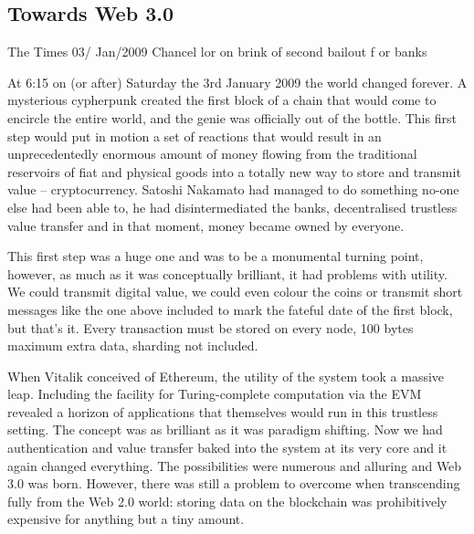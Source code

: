 \subsection{Towards Web 3.0 \statusgreen}\label{sec:towards-web3}


\begin{centerverbatim}
The Times 03/
Jan/2009 Chancel
lor on brink of 
second bailout f
or banks

\end{centerverbatim}

At 6:15 on (or after) Saturday the 3rd January 2009 the world changed forever. A mysterious cypherpunk created the first block of a chain that would come to encircle the entire world, and the genie was officially out of the bottle. This first step would put in motion a set of reactions that would result in an unprecedentedly enormous amount of money flowing from the traditional reservoirs of fiat and physical goods into a totally new way to store and transmit value -- cryptocurrency. Satoshi Nakamato had managed to do something no-one else had been able to, he had disintermediated the banks, decentralised trustless value transfer and in that moment, money became owned by everyone.

This first step was a huge one and was to be a monumental turning point, however, as much as it was conceptually brilliant, it had problems with utility. We could transmit digital value, we could even colour the coins or transmit short messages like the one above included to mark the fateful date of the first block, but that's it. Every transaction must be stored on every node, 100 bytes maximum extra data, sharding not included.

When Vitalik conceived of Ethereum, the utility of the system took a massive leap. Including the facility for Turing-complete computation via the EVM revealed a horizon of applications that themselves would run in this trustless setting. The concept was as brilliant as it was paradigm shifting. Now we had authentication and value transfer baked into the system at its very core and it again changed everything. The possibilities were numerous and alluring and Web 3.0 was born. However, there was still a problem to overcome when transcending fully from the Web 2.0 world: storing data on the blockchain was prohibitively expensive for anything but a tiny amount.


